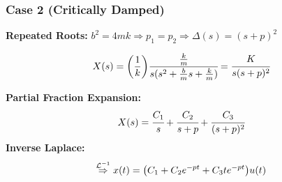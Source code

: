 \documentclass[aspectratio=169,handout]{beamer}
\begin{document}
\begin{frame}
	\frametitle{Case 2 (Critically Damped)}


	\textbf{Repeated Roots:}
	\(
		b^2 = 4mk \Rightarrow p_1 = p_2 
		\Rightarrow \Delta(s) = {(s+p)}^2
	\)

	\pause{}
	\[
		X(s) = \qty(\frac{1}{k}) \cfrac{\frac{k}{m}}{s(s^2 + \frac{b}{m} s + \frac{k}{m})}
		= \cfrac{K}{s (s+p)^2} 
	\]
	\pause{}

	\textbf{Partial Fraction Expansion:} %
	\[
		X(s) = \cfrac{C_1}{s} + \cfrac{C_2}{s+p} + \cfrac{C_3}{(s+p)^2}
	\]
	\pause{}
	\textbf{Inverse Laplace:}
	\[
		\overset{\mathcal{L}^{-1}}{\Rightarrow}
		x(t) = \qty(C_1 + C_2 e^{-pt} + C_3 t e^{-pt}) u(t)	
	\]




\end{frame}
\end{document}
